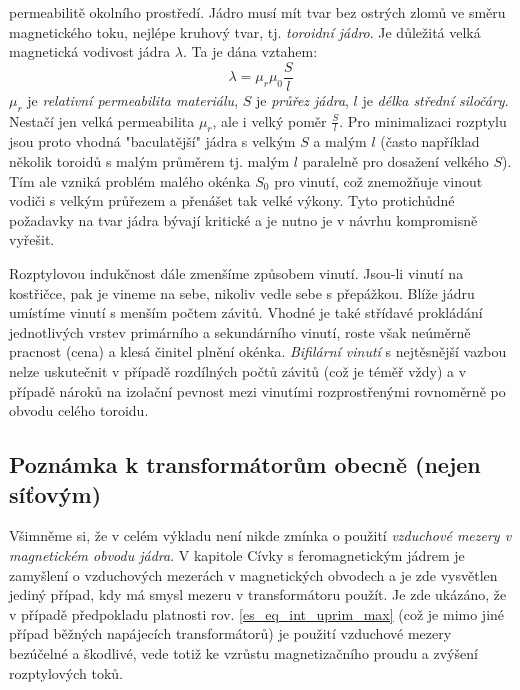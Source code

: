    permeabilitě okolního prostředí. Jádro musí mít tvar bez ostrých zlomů ve směru magnetického toku, 
    nejlépe kruhový tvar, tj. \emph{toroidní jádro}. Je důležitá velká magnetická vodivost jádra $\lambda$. 
    Ta je dána vztahem:
    \begin{equation}\label{es:eq_vodivost_jadra}
      \lambda= \mu_r\mu_0\frac{S}{l}
    \end{equation}
    $\mu_r$ je \emph{relativní permeabilita materiálu}, $S$ je \emph{průřez jádra}, $l$ je \emph{délka 
    střední siločáry}. Nestačí jen velká permeabilita  $\mu_r$, ale i velký poměr $\frac{S}{l}$. Pro 
    minimalizaci rozptylu jsou proto vhodná "baculatější" jádra s velkým $S$ a malým $l$ (často například 
    několik toroidů s malým průměrem tj. malým $l$ paralelně pro dosažení velkého $S$). Tím ale vzniká 
    problém malého okénka $S_0$ pro vinutí, což znemožňuje vinout vodiči s velkým průřezem a přenášet tak 
    velké výkony. Tyto protichůdné požadavky na tvar jádra bývají kritické a je nutno je v návrhu kompromisně 
    vyřešit.

    Rozptylovou indukčnost dále zmenšíme způsobem vinutí. Jsou-li vinutí na kostřičce, pak je vineme na sebe, 
    nikoliv vedle sebe s přepážkou. Blíže jádru umístíme vinutí s menším počtem závitů. Vhodné je také 
    střídavé prokládání jednotlivých vrstev primárního a sekundárního vinutí, roste však neúměrně pracnost 
    (cena) a klesá činitel plnění okénka. \emph{Bifilární vinutí} s nejtěsnější vazbou nelze uskutečnit v 
    případě rozdílných počtů závitů (což je téměř vždy) a v případě nároků na izolační pevnost mezi vinutími 
    rozprostřenými rovnoměrně po obvodu celého toroidu.

    \subsection*{Poznámka k transformátorům obecně (nejen síťovým)}
      Všimněme si, že v celém výkladu není nikde zmínka o použití \emph{vzduchové mezery v magnetickém obvodu 
      jádra}. V kapitole Cívky s feromagnetickým jádrem je zamyšlení o vzduchových mezerách v magnetických 
      obvodech a je zde vysvětlen jediný případ, kdy má smysl mezeru v transformátoru použít. Je zde ukázáno, 
      že v případě předpokladu platnosti rov. \ref{es_eq_int_uprim_max} (což je mimo jiné případ běžných 
      napájecích transformátorů) je použití vzduchové mezery bezúčelné a škodlivé, vede totiž ke vzrůstu 
      magnetizačního proudu a zvýšení rozptylových toků.

